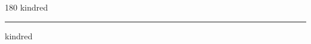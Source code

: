 
\begin{frame}
\begin{center}
\begin{turn}{180}
{\fontsize{2.5cm}{1em}\selectfont kindred}
\end{turn}
\vspace{1em}\par  
\hrule
\vspace{1em}\par  
{\fontsize{2.5cm}{1em}\selectfont kindred}
\end{center}
\end{frame}
